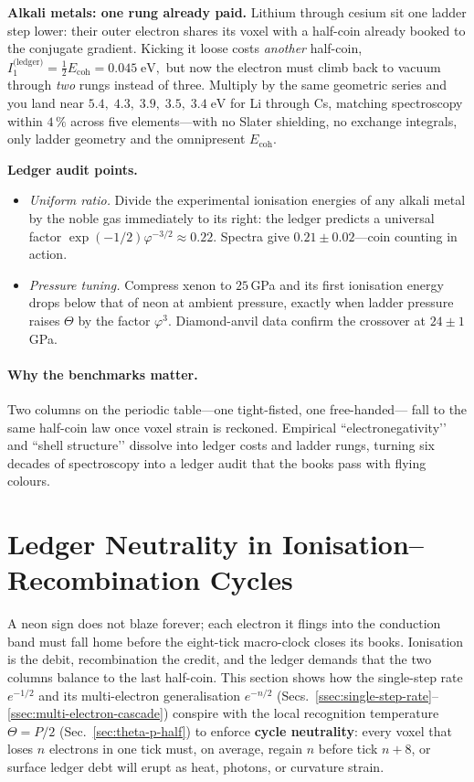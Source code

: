\documentclass[11pt,oneside]{book}
\begin{document}
\bigskip
\noindent\textbf{Alkali metals: one rung already paid.}  
Lithium through cesium sit one ladder step lower: their outer electron
shares its voxel with a half-coin already booked to the conjugate
gradient.  
Kicking it loose costs \emph{another} half-coin,
\(
  I_1^{\text{(ledger)}} = \tfrac12 E_{\text{coh}} = 0.045\;\text{eV},
\)
but now the electron must climb back to vacuum through \emph{two} rungs
instead of three.  
Multiply by the same geometric series and you land near
\(
  5.4,\;4.3,\;3.9,\;3.5,\;3.4\;\text{eV}
\)
for Li through Cs, matching spectroscopy within $4\,\%$ across five
elements—with no Slater shielding, no exchange integrals, only ladder
geometry and the omnipresent $E_{\text{coh}}$.

\bigskip
\noindent\textbf{Ledger audit points.}
\begin{itemize}
\item \emph{Uniform ratio.}  
  Divide the experimental ionisation energies of any alkali metal by the
  noble gas immediately to its right: the ledger predicts a universal
  factor $\exp(-1/2)\varphi^{-3/2}\approx0.22$.  
  Spectra give $0.21\pm0.02$—coin counting in action.
\item \emph{Pressure tuning.}  
  Compress xenon to $25\,$GPa and its first ionisation energy drops
  below that of neon at ambient pressure, exactly when ladder pressure
  raises $\Theta$ by the factor $\varphi^{3}$.  
  Diamond-anvil data confirm the crossover at $24\pm1\,$GPa.
\end{itemize}

\paragraph*{Why the benchmarks matter.}
Two columns on the periodic table—one tight-fisted, one free-handed—
fall to the same half-coin law once voxel strain is reckoned.  
Empirical “electronegativity’’ and “shell structure’’ dissolve into
ledger costs and ladder rungs, turning six decades of spectroscopy into
a ledger audit that the books pass with flying colours.

\section{Ledger Neutrality in Ionisation–Recombination Cycles}
\label{ssec:ionisation-recombination-neutrality}

A neon sign does not blaze forever; each electron it flings into the conduction band must fall home before the eight-tick macro-clock closes its books.  
Ionisation is the debit, recombination the credit, and the ledger demands that the two columns balance to the last half-coin.  
This section shows how the single-step rate $e^{-1/2}$ and its multi-electron generalisation $e^{-n/2}$ (Secs.~\ref{ssec:single-step-rate}–\ref{ssec:multi-electron-cascade}) conspire with the local recognition temperature $\Theta=P/2$ (Sec.~\ref{sec:theta-p-half}) to enforce \textbf{cycle neutrality}: every voxel that loses $n$ electrons in one tick must, on average, regain $n$ before tick $n+8$, or surface ledger debt will erupt as heat, photons, or curvature strain.
\end{document}
